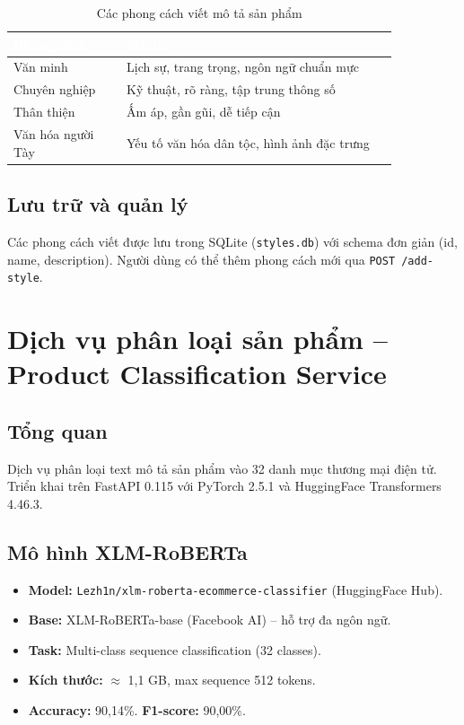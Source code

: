 \begin{table}[htbp]
\centering
\caption{Các phong cách viết mô tả sản phẩm}
\label{tab:writing-styles}
\begin{tabular}{>{\raggedright\arraybackslash}p{0.25\linewidth} >{\raggedright\arraybackslash}p{0.6\linewidth}}
\toprule
\rowcolor{headerblue} \textcolor{white}{\textbf{Phong cách}} & \textcolor{white}{\textbf{Mô tả}} \\
\midrule
\rowcolor{rowgray} Văn minh & Lịch sự, trang trọng, ngôn ngữ chuẩn mực \\
Chuyên nghiệp & Kỹ thuật, rõ ràng, tập trung thông số \\
\rowcolor{rowgray} Thân thiện & Ấm áp, gần gũi, dễ tiếp cận \\
Văn hóa người Tày & Yếu tố văn hóa dân tộc, hình ảnh đặc trưng \\
\bottomrule
\end{tabular}
\end{table}

\subsection{Lưu trữ và quản lý}

Các phong cách viết được lưu trong SQLite (\texttt{styles.db}) với schema đơn giản
(id, name, description). Người dùng có thể thêm phong cách mới qua
\texttt{POST /add-style}.

\section{Dịch vụ phân loại sản phẩm -- Product Classification Service}

\subsection{Tổng quan}

Dịch vụ phân loại text mô tả sản phẩm vào 32 danh mục thương mại điện tử.
Triển khai trên FastAPI 0.115 với PyTorch 2.5.1 và HuggingFace Transformers 4.46.3.

\subsection{Mô hình XLM-RoBERTa}

\begin{itemize}
\item \textbf{Model:} \texttt{Lezh1n/xlm-roberta-ecommerce-classifier} (HuggingFace Hub).
\item \textbf{Base:} XLM-RoBERTa-base (Facebook AI) -- hỗ trợ đa ngôn ngữ.
\item \textbf{Task:} Multi-class sequence classification (32 classes).
\item \textbf{Kích thước:} $\approx$ 1,1 GB, max sequence 512 tokens.
\item \textbf{Accuracy:} 90,14\%. \textbf{F1-score:} 90,00\%.
\end{itemize}

